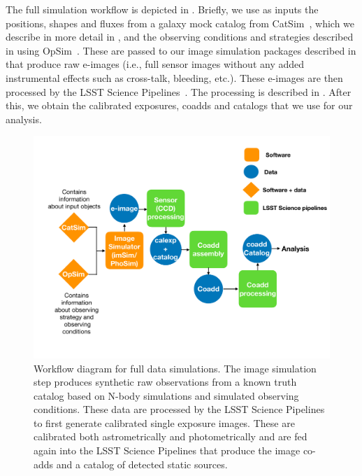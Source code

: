 \documentclass[\docopts]{\docclass}
\begin{document}
The full simulation workflow is depicted in . Briefly, we use as inputs the positions, shapes and fluxes from a galaxy mock catalog from CatSim~\citep{2010SPIE.7738E..1OC,2014SPIE.9150E..14C}, which we describe in more detail in , and the observing conditions and strategies described in  using OpSim~\citep{2014SPIE.9150E..15D}. These are passed to our image simulation packages described in  that produce raw e-images (i.e., full sensor images without any added instrumental effects such as cross-talk, bleeding, etc.). These e-images are then processed by the LSST Science Pipelines~\citep{2015arXiv151207914J, 2018PASJ...70S...5B}. The processing is described in . After this, we obtain the calibrated exposures, coadds and catalogs that we use for our analysis.

\begin{figure}
\centering
 \includegraphics[trim={0cm 1.5cm 0cm 1.05cm}, clip, width=1.0\columnwidth]{dc1_workflow}
\caption{Workflow diagram for full data simulations. The image simulation step produces synthetic raw observations from a known truth catalog based on N-body simulations and simulated observing conditions. These data are processed by the LSST Science Pipelines to first generate calibrated single exposure images. These are calibrated both astrometrically and photometrically and are fed again into the LSST Science Pipelines that produce the image co-adds and a catalog of detected static sources. 
}

\label{fig:dc1_workflow}
\end{figure}
\end{document}
